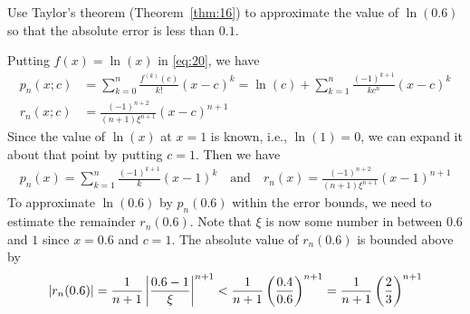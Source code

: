 \documentclass[thmcnt=section, 12pt]{my-elegantbook}
\begin{document}
\begin{exercise}
    Use Taylor's theorem (Theorem~\ref{thm:16}) to approximate the value of $\ln(0.6)$ so that the absolute error is less than $0.1$.
\end{exercise}

\begin{solution}
    Putting $f(x) = \ln(x)$ in \eqref{eq:20}, we have
    \begin{align*}
        p_n(x;c) &= \sum_{k=0}^{n} \frac{f^{(k)}(c)}{k!}(x-c)^k
        = \ln(c) + \sum_{k=1}^{n} \frac{(-1)^{k+1}}{k c^n}(x-c)^k \\ 
        r_n(x;c) &= \frac{(-1)^{n+2}}{(n+1) \xi^{n+1}}(x-c)^{n+1}
    \end{align*}
    Since the value of $\ln(x)$ at $x=1$ is known, i.e., $\ln(1) = 0$, we can expand it about that point by putting $c=1$. Then we have 
    \begin{align*}
        p_n(x) = \sum_{k=1}^{n} \frac{(-1)^{k+1}}{k}(x-1)^k
        \quad \text{and} \quad
        r_n(x) = \frac{(-1)^{n+2}}{(n+1) \xi^{n+1}}(x-1)^{n+1}
    \end{align*}
    To approximate $\ln(0.6)$ by $p_n(0.6)$ within the error bounds, we need to estimate the remainder $r_n(0.6)$. Note that $\xi$ is now some number in between $0.6$ and $1$ since $x=0.6$ and $c=1$. The absolute value of $r_n(0.6)$ is bounded above by 
    \begin{align}
        \left\lvert r_n(0.6) \right\rvert = \frac{1}{n+1} \left\lvert \frac{0.6-1}{\xi} \right\rvert^{n+1}
        < \frac{1}{n+1} \left(\frac{0.4}{0.6}\right)^{n+1}
        = \frac{1}{n+1} \left(\frac{2}{3}\right)^{n+1}
        \label{eq:25}
    \end{align}



\end{solution}
\end{document}
